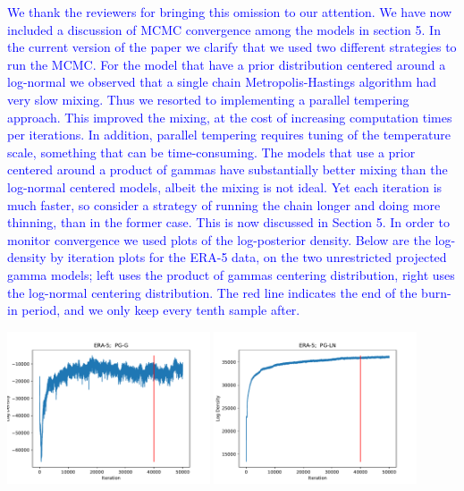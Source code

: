 \documentclass[10pt]{article}
\newcommand{\response}[1]{\textcolor{blue}{#1}}
\begin{document}
\begin{itemize}
\begin{enumerate}
\response{We thank the reviewers for bringing this omission to our attention.  We have now
            included a discussion of MCMC convergence among the models in section 5.  In the current
            version of the paper we clarify that we used two different strategies to run the MCMC.
            For the model that have a prior distribution centered around a log-normal we observed 
            that a single chain Metropolis-Hastings algorithm had very slow mixing. Thus we resorted 
            to implementing a parallel tempering approach. This improved the mixing, at the cost 
            of increasing computation times per iterations. In addition, parallel tempering requires
            tuning of the temperature scale, something that can be time-consuming. The models that
            use a prior centered around a product of gammas have substantially better mixing than the
            log-normal centered models, albeit the mixing is not ideal. Yet each iteration is much
            faster, so consider a strategy of running the chain longer and doing more thinning, than 
            in the former case. This is now discussed in Section 5. In order to monitor convergence 
            we used plots of the log-posterior density.
            Below are the log-density by iteration plots for the ERA-5 data, on the two 
            unrestricted projected gamma models; left uses the product of gammas centering distribution, 
            right uses the log-normal centering distribution.  The red line indicates the end of the 
            burn-in period, and we only keep every tenth sample after.
            }
            
            \includegraphics[width=0.45\textwidth]{images/ERA-5-PG-G.pdf}
            \includegraphics[width=0.45\textwidth]{images/ERA-5-PG-LN.pdf}


\end{enumerate}
\end{itemize}
\end{document}
